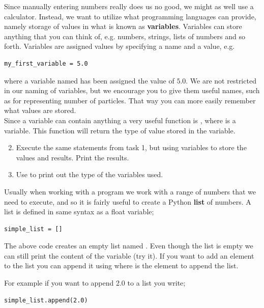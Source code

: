 \documentclass{article}
\begin{document}
Since manually entering numbers really does us no good, we might as well use a
calculator. Instead, we want to utilize what programming languages can provide,
namely storage of values in what is known as {\bf variables}. Variables can store
anything that you can think of, e.g. numbers, strings, lists of numbers and so
forth. Variables are assigned values by specifying a name and a value, e.g.

\begin{lstlisting}
my_first_variable = 5.0
\end{lstlisting}

where a variable named  has been assigned the value
of $5.0$.
We are not restricted in our naming of variables, but we encourage you to give
them useful names, such as  for representing number of
particles. That way you can more easily remember what values are stored.\\

Since a variable can contain anything a very useful function is ,
where  is a variable. This function will return the type of value stored
in the variable.

\begin{enumerate}
  \setcounter{enumi}{1}
  \item Execute the same statements from task 1, but using variables to store
    the values and results. Print the results.
  \item Use  to print out the type of the variables used.
\end{enumerate}

Usually when working with a program we work with a range of numbers
that we need to execute, and so it is fairly useful to create a Python {\bf list}
of numbers.
A list is defined in same syntax as a float variable;

\begin{lstlisting}
simple_list = []
\end{lstlisting}

The above code creates an empty list named .
Even though the list is empty we can still print
the content of the variable (try it).
If you want to add an element to the list you can
append it using  where  is the element to append the list.

For example if you want to append 2.0 to a list you write;

\begin{lstlisting}
simple_list.append(2.0)
\end{lstlisting}
\end{document}
